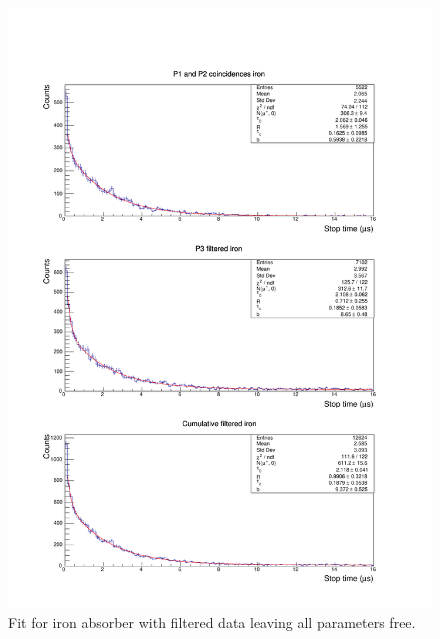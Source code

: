 \documentclass[../main.tex]{subfiles}
\begin{document}
     \FloatBarrier

     \begin{figure}[htb!]
         \centering
         \includegraphics[width=0.9\linewidth]{images/1_over_r_iron_fit.pdf}
         \caption{Fit for iron absorber with filtered data leaving all parameters free.}
         \label{fig:allFreeIron}
     \end{figure}
\end{document}
